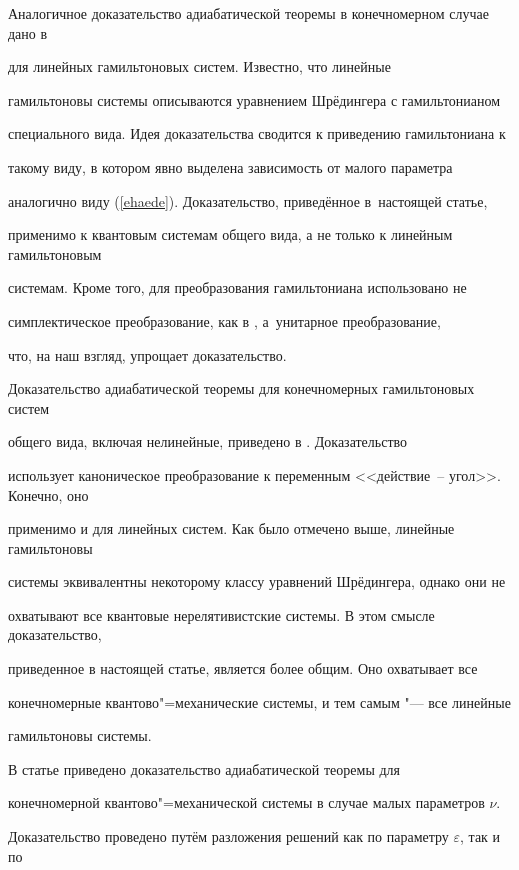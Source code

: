 Аналогичное доказательство адиабатической теоремы в конечномерном случае дано в

\cite{Levi81} для линейных гамильтоновых систем. Известно, что линейные

гамильтоновы системы описываются уравнением Шрёдингера с гамильтонианом

специального вида. Идея доказательства сводится к приведению гамильтониана к

такому виду, в котором явно выделена зависимость от малого параметра

аналогично виду (\ref{ehaede}). Доказательство, приведённое в~настоящей статье,

применимо к квантовым системам общего вида, а не только к линейным гамильтоновым

системам. Кроме того, для преобразования гамильтониана использовано не

симплектическое преобразование, как в \cite{Levi81}, а~унитарное преобразование,

что, на наш взгляд, упрощает доказательство.



Доказательство адиабатической теоремы для конечномерных гамильтоновых систем

общего вида, включая нелинейные, приведено в \cite{ArKoNe02R}. Доказательство

использует каноническое преобразование к переменным <<действие~-- угол>>. Конечно, оно

применимо и для линейных систем. Как было отмечено выше, линейные гамильтоновы

системы эквивалентны некоторому классу уравнений Шрёдингера, однако они не

охватывают все квантовые нерелятивистские системы. В этом смысле доказательство,

приведенное в настоящей статье, является более общим. Оно охватывает все

конечномерные квантово"=механические системы, и тем самым "--- все линейные

гамильтоновы системы.



В статье \cite{Arnold95} приведено доказательство адиабатической теоремы для

конечномерной квантово"=механической системы в случае малых параметров $\nu$.

Доказательство проведено путём разложения решений как по параметру $\varepsilon $, так и по


